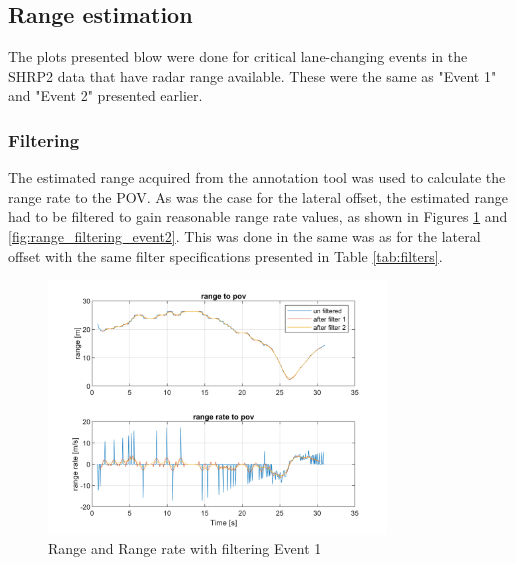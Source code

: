 \subsection{Range estimation}
The plots presented blow were done for critical lane-changing events in the SHRP2 data that have radar range available. These were the same as "Event 1" and "Event 2" presented earlier.  

\subsubsection{Filtering}
The estimated range acquired from the annotation tool was used to calculate the range rate to the POV. As was the case for the lateral offset, the estimated range had to be filtered to gain reasonable range rate values, as shown in Figures  \ref{fig:range_filtering_event1} and \ref{fig:range_filtering_event2}. This was done in the same was as for the lateral offset with the same filter specifications presented in Table \ref{tab:filters}.


\begin{figure}[H]
    \centering
    \includegraphics[width=0.8\textwidth]{FiguresMat/filter_compare_10794257.png}
    \caption{Range and Range rate with filtering Event 1}
    \label{fig:range_filtering_event1}
\end{figure}

